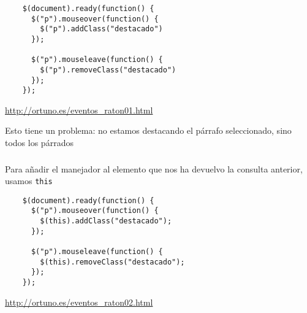 \documentclass[ucs]{beamer}
\begin{document}
\begin{frame}[fragile]
\frametitle{}


  \begin{scriptsize}
  \begin{verbatim}
    $(document).ready(function() {
      $("p").mouseover(function() {
        $("p").addClass("destacado")
      });

      $("p").mouseleave(function() {
        $("p").removeClass("destacado")
      });
    });
  \end{verbatim}
  \end{scriptsize}


\begin{tiny}
\begin{flushright}
\url{http://ortuno.es/eventos_raton01.html}
\end{flushright}
\end{tiny}

Esto tiene un problema: no estamos destacando el párrafo seleccionado,
sino todos los párrados

\end{frame}


\begin{frame}[fragile]
\frametitle{}
Para añadir el manejador al elemento que nos ha devuelvo la consulta
anterior, usamos \verb|this|


  \begin{scriptsize}
  \begin{verbatim}
    $(document).ready(function() {
      $("p").mouseover(function() {
        $(this).addClass("destacado");
      });

      $("p").mouseleave(function() {
        $(this).removeClass("destacado");
      });
    });
  \end{verbatim}
  \end{scriptsize}


\begin{tiny}
\begin{flushright}
\url{http://ortuno.es/eventos_raton02.html}
\end{flushright}
\end{tiny}
\end{frame}
\end{document}
